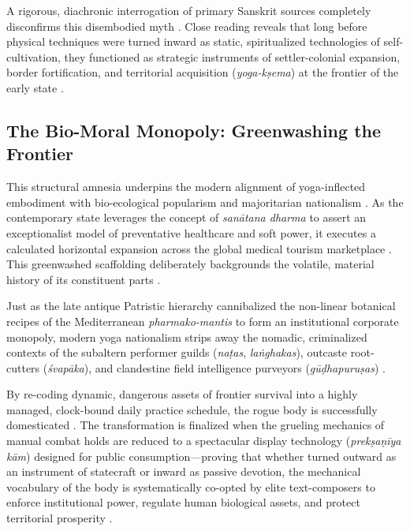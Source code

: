\documentclass[11pt,letterpaper]{article}
\begin{document}
A rigorous, diachronic interrogation of primary Sanskrit sources completely disconfirms this disembodied myth \cite{Birch2024, McCartney2021, McCartney2026}. Close reading reveals that long before physical techniques were turned inward as static, spiritualized technologies of self-cultivation, they functioned as strategic instruments of settler-colonial expansion, border fortification, and territorial acquisition (\textit{yoga-kṣema}) at the frontier of the early state \cite{Birch2024, McCartney2021, McCartney2026}.

\subsection{The Bio-Moral Monopoly: Greenwashing the Frontier}

This structural amnesia underpins the modern alignment of yoga-inflected embodiment with bio-ecological popularism and majoritarian nationalism \cite{McCartney2021}. As the contemporary state leverages the concept of \textit{sanātana dharma} to assert an exceptionalist model of preventative healthcare and soft power, it executes a calculated horizontal expansion across the global medical tourism marketplace \cite{McCartney2021}. This greenwashed scaffolding deliberately backgrounds the volatile, material history of its constituent parts \cite{McCartney2021, McCartney2026}. 

Just as the late antique Patristic hierarchy cannibalized the non-linear botanical recipes of the Mediterranean \textit{pharmako-mantis} to form an institutional corporate monopoly, modern yoga nationalism strips away the nomadic, criminalized contexts of the subaltern performer guilds (\textit{naṭas}, \textit{laṅghakas}), outcaste root-cutters (\textit{śvapāka}), and clandestine field intelligence purveyors (\textit{gūḍhapuruṣas}) \cite{McCartney2026}. 

By re-coding dynamic, dangerous assets of frontier survival into a highly managed, clock-bound daily practice schedule, the rogue body is successfully domesticated \cite{McCartney2026}. The transformation is finalized when the grueling mechanics of manual combat holds are reduced to a spectacular display technology (\textit{prekṣaṇīya kām}) designed for public consumption—proving that whether turned outward as an instrument of statecraft or inward as passive devotion, the mechanical vocabulary of the body is systematically co-opted by elite text-composers to enforce institutional power, regulate human biological assets, and protect territorial prosperity \cite{McCartney2021, McCartney2026}.
\end{document}
